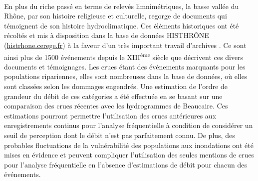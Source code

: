 	\paragraph{} En plus du riche passé en terme de relevés limnimétriques, la basse vallée du Rhône, par son histoire religieuse et culturelle, regorge de documents qui témoignent de son histoire hydroclimatique. Ces éléments historiques ont été récoltés et mis à disposition dans la base de données HISTHRÔNE (\url{histrhone.cerege.fr}) à la faveur d'un très important travail d'archives \citep{pichard_sept_2014}. Ce sont ainsi plus de 1500 événements depuis le XIII\textsuperscript{ème} siècle que décrivent ces divers documents et témoignages. Les crues étant des événements marquants pour les populations ripariennes, elles sont nombreuses dans la base de données, où elles sont classées selon les dommages engendrés. Une estimation de l'ordre de grandeur du débit de ces catégories a été effectuée en se basant sur une comparaison des crues récentes avec les hydrogrammes de Beaucaire. Ces estimations pourront permettre l'utilisation des crues antérieures aux enregistrements continus pour l'analyse fréquentielle à condition de considérer un seuil de perception dont le débit n'est pas parfaitement connu. De plus, des probables fluctuations de la vulnérabilité des populations aux inondations ont été mises en évidence et peuvent compliquer l'utilisation des seules mentions de crues pour l'analyse fréquentielle en l'absence d'estimations de débit pour chacun des événements. 

